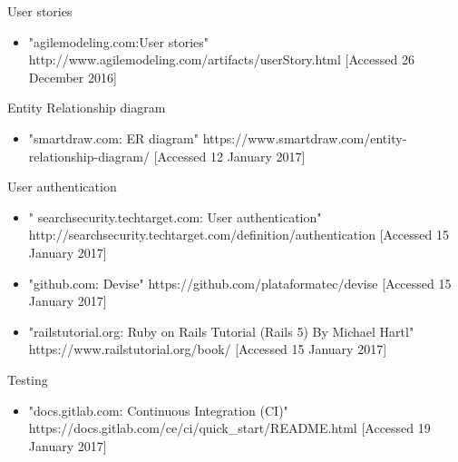 \documentclass{l3proj}
\begin{document}
\label{user_stories}

User stories

\begin{itemize}

\item "agilemodeling.com:User stories"
\newline http://www.agilemodeling.com/artifacts/userStory.html [Accessed 26 December 2016]

\end{itemize}


\label{er}
Entity Relationship diagram

\begin{itemize}

\item "smartdraw.com: ER diagram"
\newline https://www.smartdraw.com/entity-relationship-diagram/ [Accessed 12 January 2017]

\end{itemize}

\label{authentication}
User authentication

\begin{itemize}

\item " searchsecurity.techtarget.com: User authentication"
\newline http://searchsecurity.techtarget.com/definition/authentication [Accessed 15 January 2017]

\item "github.com: Devise"
\newline https://github.com/plataformatec/devise [Accessed 15 January 2017]

\item "railstutorial.org: Ruby on Rails Tutorial (Rails 5) By Michael Hartl"
\newline https://www.railstutorial.org/book/ [Accessed 15 January 2017]

\end{itemize}

\label{testing}

Testing

\begin{itemize}

\item "docs.gitlab.com: Continuous Integration (CI)" 
\newline https://docs.gitlab.com/ce/ci/quick\_start/README.html [Accessed 19 January 2017]

\end{itemize}
\end{document}
